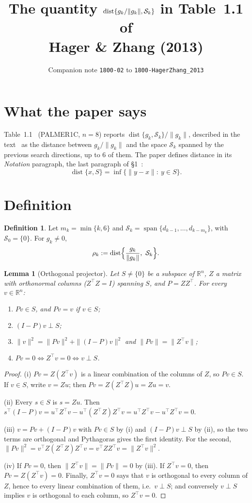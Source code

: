 \documentclass[11pt]{article}
\title{The quantity $\dist\{g_k/\|g_k\|,\Sk\}$ in Table~1.1 of\\
Hager \& Zhang (2013)}
\author{Companion note \texttt{1800-02} to \texttt{1800-HagerZhang\_2013}}
\date{}
\newtheorem{lemma}{Lemma}
\theoremstyle{definition}
\newtheorem{definition}{Definition}
\newcommand{\R}{\mathbb{R}}
\newcommand{\Sk}{\mathcal{S}_k}
\newcommand{\dist}{\operatorname{dist}}
\newcommand{\spn}{\operatorname{span}}
\begin{document}
\maketitle

\section{What the paper says}

Table~1.1~\cite[p.~2151]{HZ13} (PALMER1C, $n=8$) reports
$\dist\{g_k,\Sk\}/\|g_k\|$, described in the text~\cite[pp.~2151--2152]{HZ13}
as the distance between $g_k/\|g_k\|$ and the space $\Sk$ spanned by the
previous search directions, up to 6 of them. The paper defines distance in
its \emph{Notation} paragraph, the last paragraph of \S1~\cite[p.~2153]{HZ13}:
\[
\dist\{x,S\}=\inf\{\|y-x\|:\ y\in S\}.
\]

\section{Definition}

\begin{definition}
Let $m_k=\min\{k,6\}$ and
$\Sk=\spn\{d_{k-1},\dots,d_{k-m_k}\}$, with $\mathcal S_0=\{0\}$. For $g_k\ne0$,
\[
\rho_k:=\dist\Bigl\{\frac{g_k}{\|g_k\|},\ \Sk\Bigr\}.
\]
\end{definition}

\begin{lemma}[Orthogonal projector]\label{lem}
Let $S\ne\{0\}$ be a subspace of $\R^n$, $Z$ a matrix with orthonormal columns
($Z^{\top}Z=I$) spanning $S$, and $P=ZZ^{\top}$. For every $v\in\R^n$:
\begin{enumerate}
\item[(i)] $Pv\in S$, and $Pv=v$ if $v\in S$;
\item[(ii)] $(I-P)v\perp S$;
\item[(iii)] $\|v\|^2=\|Pv\|^2+\|(I-P)v\|^2$ and $\|Pv\|=\|Z^{\top}v\|$;
\item[(iv)] $Pv=0\iff Z^{\top}v=0\iff v\perp S$.
\end{enumerate}
\end{lemma}

\begin{proof}
(i) $Pv=Z(Z^{\top}v)$ is a linear combination of the columns of $Z$, so
$Pv\in S$. If $v\in S$, write $v=Zu$; then $Pv=Z(Z^{\top}Z)u=Zu=v$.

(ii) Every $s\in S$ is $s=Zu$. Then
$s^{\top}(I-P)v=u^{\top}Z^{\top}v-u^{\top}(Z^{\top}Z)Z^{\top}v
=u^{\top}Z^{\top}v-u^{\top}Z^{\top}v=0$.

(iii) $v=Pv+(I-P)v$ with $Pv\in S$ by (i) and $(I-P)v\perp S$ by (ii), so the
two terms are orthogonal and Pythagoras gives the first identity. For the
second, $\|Pv\|^2=v^{\top}Z(Z^{\top}Z)Z^{\top}v=v^{\top}ZZ^{\top}v=\|Z^{\top}v\|^2$.

(iv) If $Pv=0$, then $\|Z^{\top}v\|=\|Pv\|=0$ by (iii). If $Z^{\top}v=0$, then
$Pv=Z(Z^{\top}v)=0$. Finally, $Z^{\top}v=0$ says that $v$ is orthogonal to
every column of $Z$, hence to every linear combination of them, i.e.\
$v\perp S$; and conversely $v\perp S$ implies $v$ is orthogonal to each
column, so $Z^{\top}v=0$.
\end{proof}
\end{document}
